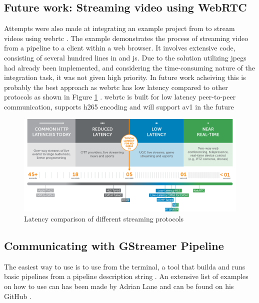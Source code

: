 \subsection{Future work: Streaming video using WebRTC}
Attempts were also made at integrating an example project from \gs  to stream videos using \gls{webrtc} \cite{gstreamerWebrtcMasterGStreamer2021}.
The example demonstrates the process of streaming video from a pipeline to a client within a web browser. It involves extensive code, consisting of several hundred lines in \py and \gls{js}.
Due to the solution utilizing \glspl{jpeg} had already been implemented, and considering the time-consuming nature of the integration task, it was not given high priority.
In future work acheiving this is probably the best approach as \gls{webrtc} has low latency compared to other protocols as shown in Figure \ref{fig:streaming_latency} \cite{doughertyUltraLowLatency2022}.
\gls{webrtc} is built for low latency peer-to-peer communication, supports \gls{h265} encoding and will support \gls{av1} in the future \cite[1]{loretoRealTimeCommunicationWebRTC2014} \cite{mekyaFirstHEVC2652020}
\cite{red5proKeyReasonsAV12023}
\begin{figure}[H]
    \centering
    \includegraphics[width=\textwidth]{figures/webrtc_latency.png}
    \caption{Latency comparison of different streaming protocols \cite{doughertyUltraLowLatency2022}}
    \label{fig:streaming_latency}
\end{figure}

\subsection{Communicating with GStreamer Pipeline}
The easiest way to use \gs is to use  from the terminal, a tool that builda and runs basic \gs pipelines from a pipeline description string \cite{Gstlaunch1}.
An extensive list of examples on how to use  can has been made by Adrian Lane and can be found on his GitHub \cite{laneGStreamerPipelineSamples2020}.

